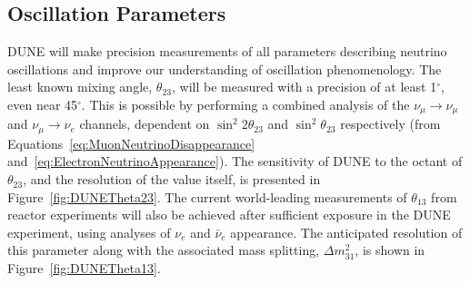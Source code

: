 \subsection{Oscillation Parameters}\label{sec:DUNEOscillationParameters}

DUNE will make precision measurements of all parameters describing neutrino oscillations and improve our understanding of oscillation phenomenology.  The least known mixing angle, $\theta_{23}$, will be measured with a precision of at least 1$^{\circ}$, even near 45$^{\circ}$.  This is possible by performing a combined analysis of the $\nu_{\mu}\rightarrow\nu_{\mu}$ and $\nu_{\mu}\rightarrow\nu_e$ channels, dependent on $\sin^2{2\theta_{23}}$ and $\sin^2{\theta_{23}}$ respectively (from Equations~\ref{eq:MuonNeutrinoDisappearance} and~\ref{eq:ElectronNeutrinoAppearance}).  The sensitivity of DUNE to the octant of $\theta_{23}$, and the resolution of the value itself, is presented in Figure~\ref{fig:DUNETheta23}.  The current world-leading measurements of $\theta_{13}$ from reactor experiments will also be achieved after sufficient exposure in the DUNE experiment, using analyses of $\nu_e$ and $\bar{\nu}_e$ appearance.  The anticipated resolution of this parameter along with the associated mass splitting, $\Delta m_{31}^2$, is shown in Figure~\ref{fig:DUNETheta13}.

